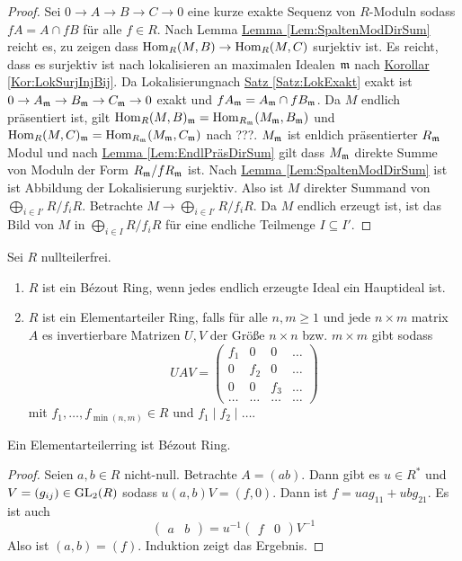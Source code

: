 \begin{proof}
    Sei $0\to A\to B\to C\to 0$ eine kurze exakte Sequenz von $R$-Moduln sodass $fA=A\cap fB$ für alle $f\in R$. Nach Lemma \hyperref[Lem:SpaltenModDirSum]{Lemma \ref{Lem:SpaltenModDirSum}} reicht es, zu zeigen dass $\operatorname{Hom}_R(M,B)\to \operatorname{Hom}_R(M,C)$ surjektiv ist. Es reicht, dass es surjektiv ist nach lokalisieren an maximalen Idealen $\mathfrak{m}$ nach \hyperref[Kor:LokSurjInjBij]{Korollar \ref{Kor:LokSurjInjBij}}. Da Lokalisierungnach \hyperref[Satz:LokExakt]{Satz \ref{Satz:LokExakt}} exakt ist $0\to A_{\mathfrak{m}}\to B_{\mathfrak{m}}\to C_{\mathfrak{m}}\to 0$ exakt und $fA_{\mathfrak{m}}=A_{\mathfrak{m}}\cap fB_{\mathfrak{m}}$.
    Da $M$ endlich präsentiert ist, gilt $\operatorname{Hom}_R(M,B)_{\mathfrak{m}}=\operatorname{Hom}_{R_{\mathfrak{m}}}(M_{\mathfrak{m}},B_{\mathfrak{m}})$ und $\operatorname{Hom}_R(M,C)_{\mathfrak{m}}=\operatorname{Hom}_{R_{\mathfrak{m}}}(M_{\mathfrak{m}},C_{\mathfrak{m}})$ nach ???. $M_{\mathfrak{m}}$ ist enldich präsentierter $R_{\mathfrak{m}}$ Modul und nach \hyperref[Lem:EndlPräsDirSum]{Lemma \ref{Lem:EndlPräsDirSum}} gilt dass $M_{\mathfrak{m}}$ direkte Summe von Moduln der Form $R_{\mathfrak{m}}/fR_{\mathfrak{m}}$ ist. Nach \hyperref[Lem:SpaltenModDirSum]{Lemma \ref{Lem:SpaltenModDirSum}} ist ist Abbildung der Lokalisierung surjektiv. Also ist $M$ direkter Summand von $\bigoplus_{i\in I'}R/f_iR$. Betrachte $M\to\bigoplus_{i\in I'}R/f_iR$. Da $M$ endlich erzeugt ist, ist das Bild von $M$ in $\bigoplus_{i\in I}R/f_iR$ für eine endliche Teilmenge $I\subseteq I'$.
\end{proof}
\begin{Def}
    Sei $R$ nullteilerfrei.
    \begin{enumerate}
        \item $R$ ist ein Bézout Ring, wenn jedes endlich erzeugte Ideal ein Hauptideal ist.
        \item $R$ ist ein Elementarteiler Ring, falls für alle $n,m\geq 1$ und jede $n\times m$ matrix $A$ es invertierbare Matrizen $U,V$ der Größe $n\times n$ bzw. $m\times m$ gibt sodass $$UAV=\begin{pmatrix}
            f_1 & 0& 0& \dots\\ 0& f_2 & 0& \dots \\ 0&0 & f_3& \dots\\ \dots & \dots & \dots & \dots
        \end{pmatrix}$$ mit $f_1,\dots,f_{\min(n,m)}\in R$ und $f_1\mid f_2\mid\dots$.
    \end{enumerate}
\end{Def}
\begin{Lemma}
    Ein Elementarteilerring ist Bézout Ring.
\end{Lemma}
\begin{proof}
    Seien $a,b\in R$ nicht-null. Betrachte $A=(a b)$. Dann gibt es $u\in R^*$ und $V=(g_{ij})\in \operatorname{GL}_2(R)$ sodass $u(a,b)V=(f,0)$.
    Dann ist $f=uag_{11}+ubg_{21}$. Es ist auch $$\begin{pmatrix}
        a & b    \end{pmatrix}=u^{-1}\begin{pmatrix}
            f & 0
        \end{pmatrix} V^{-1}
$$ Also ist $(a,b)=(f)$. Induktion zeigt das Ergebnis.

\end{proof}

